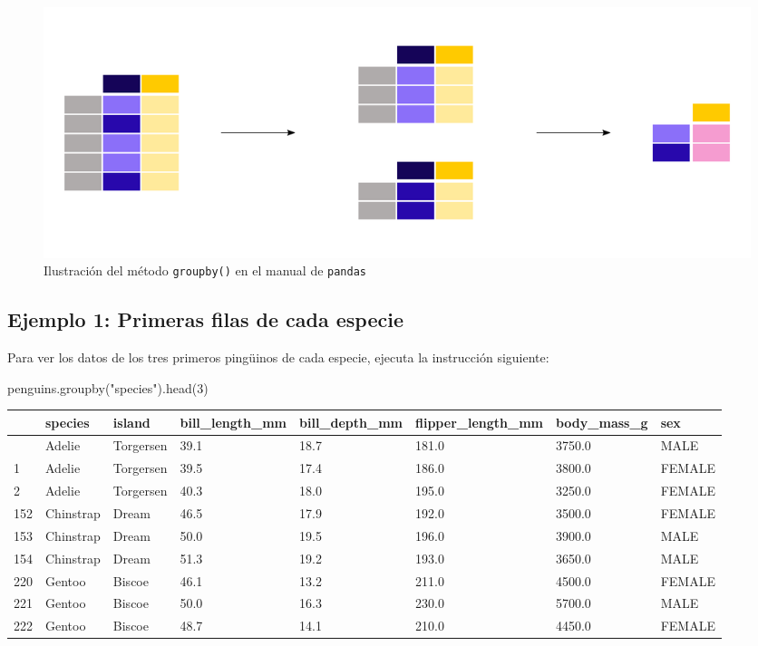 \documentclass[
  a4paper,
  noprof,
  12pt,
  notoc,
  nosols,
  nobib]{mnye}
\newenvironment{Shaded}{\begin{snugshade}}{\end{snugshade}}
\newcommand{\DecValTok}[1]{\textcolor[rgb]{0.68,0.00,0.00}{#1}}
\newcommand{\NormalTok}[1]{\textcolor[rgb]{0.00,0.23,0.31}{#1}}
\newcommand{\StringTok}[1]{\textcolor[rgb]{0.13,0.47,0.30}{#1}}
\theoremstyle{definition}
\theoremstyle{remark}
\begin{document}
\begin{figure}[tbph]

{\centering \includegraphics{index_files/mediabag/chapters/../img/06_groupby.pdf}

}

\caption{Ilustración del método \texttt{groupby()} en el manual de
\texttt{pandas}}

\end{figure}%

\subsection*{Ejemplo 1: Primeras filas de cada
especie}\label{ejemplo-1-primeras-filas-de-cada-especie}


Para ver los datos de los tres primeros pingüinos de cada especie,
ejecuta la instrucción siguiente:

\begin{Shaded}
\begin{Highlighting}[]
\NormalTok{penguins.groupby(}\StringTok{"species"}\NormalTok{).head(}\DecValTok{3}\NormalTok{)}
\end{Highlighting}
\end{Shaded}

\begin{longtable}[]{@{}llllllll@{}}
\toprule\noalign{}
& species & island & bill\_length\_mm & bill\_depth\_mm &
flipper\_length\_mm & body\_mass\_g & sex \\
\midrule\noalign{}
\endhead
\bottomrule\noalign{}
\endlastfoot
0 & Adelie & Torgersen & 39.1 & 18.7 & 181.0 & 3750.0 & MALE \\
1 & Adelie & Torgersen & 39.5 & 17.4 & 186.0 & 3800.0 & FEMALE \\
2 & Adelie & Torgersen & 40.3 & 18.0 & 195.0 & 3250.0 & FEMALE \\
152 & Chinstrap & Dream & 46.5 & 17.9 & 192.0 & 3500.0 & FEMALE \\
153 & Chinstrap & Dream & 50.0 & 19.5 & 196.0 & 3900.0 & MALE \\
154 & Chinstrap & Dream & 51.3 & 19.2 & 193.0 & 3650.0 & MALE \\
220 & Gentoo & Biscoe & 46.1 & 13.2 & 211.0 & 4500.0 & FEMALE \\
221 & Gentoo & Biscoe & 50.0 & 16.3 & 230.0 & 5700.0 & MALE \\
222 & Gentoo & Biscoe & 48.7 & 14.1 & 210.0 & 4450.0 & FEMALE \\
\end{longtable}
\end{document}
